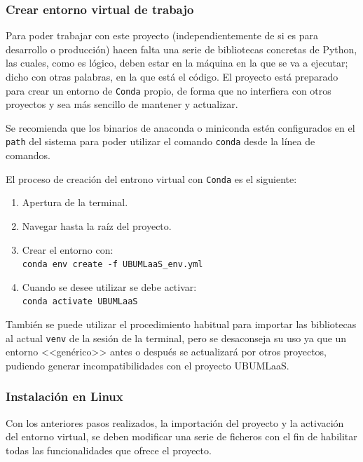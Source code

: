 \subsubsection{Crear entorno virtual de trabajo}
Para poder trabajar con este proyecto (independientemente de si es para desarrollo o producción) hacen falta una serie de bibliotecas concretas de Python, las cuales, como es lógico, deben estar en la máquina en la que se va a ejecutar; dicho con otras palabras, en la que está el código. El proyecto está preparado para crear un entorno de \texttt{Conda} propio, de forma que no interfiera con otros proyectos y sea más sencillo de mantener y actualizar.

Se recomienda que los binarios de anaconda o miniconda estén configurados en el \texttt{path} del sistema para poder utilizar el comando \texttt{conda} desde la línea de comandos.

El proceso de creación del entrono virtual con \texttt{Conda} es el siguiente:
\begin{enumerate}
\tightlist
\item Apertura de la terminal.
\item Navegar hasta la raíz del proyecto.
\item Crear el entorno con:\\
\texttt{conda env create -f UBUMLaaS\_env.yml}
\item Cuando se desee utilizar se debe activar:\\
\texttt{conda activate UBUMLaaS}
\end{enumerate}

También se puede utilizar el procedimiento habitual para importar las bibliotecas al actual \texttt{venv} de la sesión de la terminal, pero se desaconseja su uso ya que un entorno <<genérico>> antes o después se actualizará por otros proyectos, pudiendo generar incompatibilidades con el proyecto UBUMLaaS.

\subsubsection{Instalación en Linux}
Con los anteriores pasos realizados, la importación del proyecto y la activación del entorno virtual, se deben modificar una serie de ficheros con el fin de habilitar todas las funcionalidades que ofrece el proyecto. 

